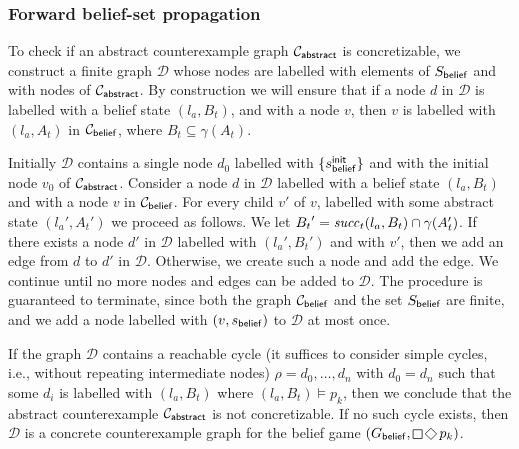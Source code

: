 \subsubsection{Forward belief-set propagation}

To check if an abstract counterexample graph $\mathcal{C}_{\mathsf{abstract}}$ is concretizable, we construct a finite graph $\mathcal{D}$ whose nodes are labelled with elements of $S_{\mathsf{belief}}$ and with nodes of $\mathcal{C}_{\mathsf{abstract}}$.
By construction we will ensure that if a node $d$ in $\mathcal D$ is labelled with a belief state $(l_a,B_t)$, and with a node $v$, then $v$ is labelled with $(l_a,A_t)$ in $\mathcal{C}_{\mathsf{belief}}$, where $B_t \subseteq \gamma(A_t)$. 

Initially $\mathcal D$ contains a single node $d_0$ labelled with $\{s_{\mathsf{belief}}^{\mathsf{init}}\}$ and with the initial node $v_0$ of $\mathcal{C}_{\mathsf{abstract}}$. Consider a node $d$ in $\mathcal D$ labelled with a belief state $(l_a,B_t)$ and with a node $v$ in $\mathcal{C}_{\mathsf{belief}}$. For every child $v'$ of $v$, labelled with some abstract state $(l_a',A_t')$ we proceed as follows. We let ${B_t}' = \mathit{succ}_t(l_a,B_t) \cap \gamma(A_t')$. If there exists a node $d'$ in $\mathcal D$ labelled with $(l_a',B_t')$ and with $v'$, then we add an edge from $d$ to $d'$ in $\mathcal{D}$. Otherwise, we create such a node and add the edge. We continue until no more nodes and edges can be added to $\mathcal D$. The procedure is guaranteed to terminate, since both the graph $\mathcal{C}_{\mathsf{belief}}$ and the set $S_{\mathsf{belief}}$ are finite, and we add a node labelled with $(v,s_{\mathsf{belief}})$ to $\mathcal D$ at most once.

If the graph $\mathcal D$ contains a reachable cycle (it suffices to consider simple cycles, i.e., without repeating intermediate nodes) $\rho = d_0,\ldots,d_n$ with $d_0 = d_n$ such that some $d_i$ is labelled with $(l_a,B_t)$ where $(l_a,B_t) \models p_k$, then we conclude that the abstract counterexample $\mathcal{C}_{\mathsf{abstract}}$ is not concretizable. If no such cycle exists, then $\mathcal D$ is a concrete counterexample graph for the belief game $(G_\belief,\LTLglobally\LTLfinally p_k)$. 

